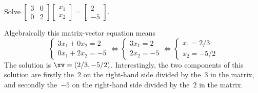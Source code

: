 \begin{example} 
Solve 
\(\begin{bmatrix} 3&0\\0&2 \end{bmatrix}
\begin{bmatrix} x_1\\x_2 \end{bmatrix}
=\begin{bmatrix} 2\\-5 \end{bmatrix}\).
\begin{solution}
Algebraically this matrix-vector equation means
\begin{equation*}
\begin{cases} 3x_1+0x_2=2 \\ 0x_1+2x_2=-5\end{cases}
\iff
\begin{cases} 3x_1=2 \\ 2x_2=-5\end{cases}
\iff
\begin{cases} x_1=2/3 \\ x_2=-5/2\end{cases}
\end{equation*}
The solution is \(\xv=(2/3,-5/2)\).
Interestingly, the two components of this solution are firstly the~\(2\) on the right-hand side divided by the~\(3\) in the matrix, and secondly the~\(-5\) on the right-hand side divided by the~\(2\) in the matrix.
\end{solution}
\end{example}







